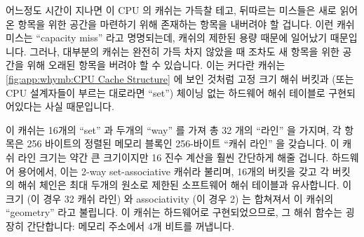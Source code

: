 어느정도 시간이 지나면 이 CPU 의 캐쉬는 가득찰 테고, 뒤따르는 미스들은 새로
읽어온 항목을 위한 공간을 마련하기 위해 존재하는 항목을 내버려야 할 겁니다.
이런 캐쉬 미스는 ``capacity miss'' 라고
명명되는데, 캐쉬의 제한된 용량 때문에 일어났기 때문입니다.
그러나, 대부분의 캐쉬는 완전히 가득 차지 않았을 때 조차도 새 항목을 위한 공간을
위해 오래된 항목을 버려야 할 수 있습니다.
이는 커다란 캐쉬는
\cref{fig:app:whymb:CPU Cache Structure} 에 보인 것처럼
고정 크기 해쉬 버킷과 (또는 CPU 설계자들이 부르는 대로라면 ``set'') 체이닝
없는 하드웨어 해쉬 테이블로 구현되어있다는 사실 때문입니다.

\iffalse

Data flows among the CPUs' caches and memory in fixed-length blocks
called ``cache lines'', which are normally a power of two in size,
ranging from 16 to 256 bytes.
When a given data item is first accessed by a given CPU, it will
be absent from that CPU's cache, meaning that a ``cache miss''
(or, more specifically, a ``startup'' or ``warmup'' cache miss)
has occurred.
The cache miss means that the CPU will
have to wait (or be ``stalled'') for hundreds of cycles while the
item is fetched from memory.
However, the item will be loaded into that CPU's cache, so that
subsequent accesses will find it in the cache and therefore run
at full speed.

After some time, the CPU's cache will fill, and subsequent
misses will likely need to eject an item from the cache in order
to make room for the newly fetched item.
Such a cache miss is termed a ``capacity miss'', because it is caused
by the cache's limited capacity.
However, most caches can be forced to eject an old item to make room
for a new item even when they are not yet full.
This is due to the fact that large caches are implemented as hardware
hash tables with fixed-size hash buckets (or ``sets'', as CPU designers
call them) and no chaining, as shown in
\cref{fig:app:whymb:CPU Cache Structure}.

\fi

이 캐쉬는 16개의 ``set'' 과 두개의 ``way'' 를 가져 총 32 개의 ``라인'' 을
가지며, 각 항목은 256 바이트의 정렬된 메모리 블록인 256-바이트 ``캐쉬 라인'' 을
갖습니다.
이 캐쉬 라인 크기는 약간 큰 크기이지만 16 진수 계산을 훨씬 간단하게 해줄
겁니다.
하드웨어 용어에서, 이는 2-way set-associative 캐쉬라 불리며, 16개의 버킷을 갖고
각 버킷의 해쉬 체인은 최대 두개의 원소로 제한된 소프트웨어 해쉬 테이블과
유사합니다.
이 크기 (이 경우 32 캐쉬 라인) 와 associativity (이 경우 2) 는 합쳐져서 이
캐쉬의 ``geometry'' 라고 불립니다.
이 캐쉬는 하드웨어로 구현되었으므로, 그 해쉬 함수는 굉장히 간단합니다:
메모리 주소에서 4개 비트를 꺼냅니다.

